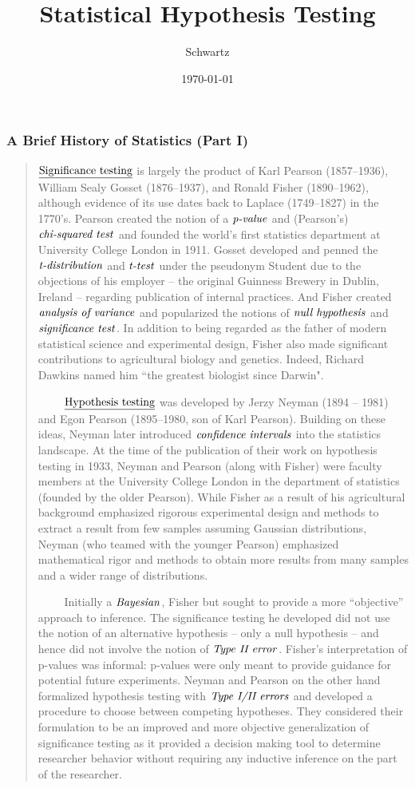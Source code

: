 \documentclass[xcolor={dvipsnames}]{beamer}
\title{Statistical Hypothesis Testing}
\author{Schwartz}
\date{\today}
\begin{document}
\frame{\titlepage}

\frame
{
 \frametitle{A Brief History of Statistics (Part I)}

{
\selectfont
\begin{quote}
\tiny
\justify

 $\textrm{\underline{Significance testing}}$ is largely the product of Karl Pearson (1857--1936), William Sealy Gosset (1876--1937), and Ronald Fisher (1890--1962), although evidence of its use dates back to Laplace (1749--1827) in the 1770's.    
Pearson created the notion of a $\textrm{\emph{p-value}}$ and (Pearson's) $\textrm{\emph{chi-squared test}}$ and founded the 
world's first statistics department at University College London in 1911.  
Gosset developed and penned the $\textrm{\emph{t-distribution}}$ and $\textrm{\emph{t-test}}$ under the 
pseudonym Student due to the objections of his employer -- the original Guinness Brewery in Dublin, Ireland -- regarding publication of internal practices.  And Fisher created $\textrm{\emph{analysis of variance}}$ and popularized the notions of $\textrm{\emph{null hypothesis}}$ and $\textrm{\emph{significance test}}$. In addition to being regarded as the father of modern statistical science and experimental design, Fisher also made significant contributions to agricultural biology and genetics.  Indeed,  Richard Dawkins named him ``the greatest biologist since Darwin". 

$\quad\quad$  $\textrm{\underline{Hypothesis testing}}$ was developed by Jerzy Neyman (1894 -- 1981) and Egon Pearson (1895--1980, son of Karl Pearson). Building on these ideas, Neyman later introduced $\textrm{\emph{confidence intervals}}$ into the statistics landscape.   At the time of the publication of their work on hypothesis testing in 1933,
Neyman and Pearson (along with Fisher) were faculty members at the University College London in the department of statistics (founded by the older Pearson).   
While Fisher as a result of his agricultural background emphasized rigorous experimental design and methods to extract a result from few samples assuming Gaussian distributions, Neyman (who teamed with the younger Pearson) emphasized mathematical rigor and methods to obtain more results from many samples and a wider range of distributions. 

$\quad\quad$ Initially a $\textrm{\emph{Bayesian}}$, Fisher but sought to provide a more ``objective'' approach to inference. The significance testing he developed did not use the notion of an alternative hypothesis -- only a null hypothesis -- and hence did not involve the notion of $\textrm{\emph{Type II error}}$. Fisher's interpretation of p-values was informal: p-values were only meant to provide guidance for potential future experiments.  Neyman and Pearson on the other hand formalized hypothesis testing with $\textrm{\emph{Type I/II errors}}$ and developed a procedure to choose between competing hypotheses. They considered their formulation to be an improved and more objective generalization of significance testing as it provided a decision making tool to determine researcher behavior without requiring any inductive inference on the part of the researcher.  

\end{quote}
}
}
\end{document}
